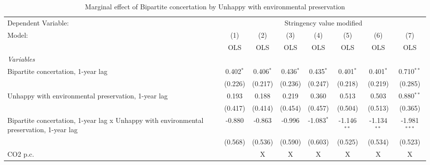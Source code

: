 
\begin{table}[htbp]
   \caption{Marginal effect of Bipartite concertation by Unhappy with environmental preservation}
   \centering
   \begin{tabular}{lccccccc}
      \toprule
      Dependent Variable: & \multicolumn{7}{c}{Stringency value modified}\\
      Model:                                                                                   & (1)         & (2)         & (3)         & (4)          & (5)           & (6)           & (7)\\  
                                                                                               &  OLS        & OLS         & OLS         & OLS          & OLS           & OLS           & OLS\\  
      \midrule
      \emph{Variables}\\
      Bipartite concertation, 1-year lag                                                       & 0.402$^{*}$ & 0.406$^{*}$ & 0.436$^{*}$ & 0.435$^{*}$  & 0.401$^{*}$   & 0.401$^{*}$   & 0.710$^{**}$\\   
                                                                                               & (0.226)     & (0.217)     & (0.236)     & (0.247)      & (0.218)       & (0.219)       & (0.285)\\   
      Unhappy with environmental preservation, 1-year lag                                      & 0.193       & 0.188       & 0.219       & 0.360        & 0.513         & 0.503         & 0.880$^{**}$\\   
                                                                                               & (0.417)     & (0.414)     & (0.454)     & (0.457)      & (0.504)       & (0.513)       & (0.365)\\   
      Bipartite concertation, 1-year lag x Unhappy with environmental preservation, 1-year lag & -0.880      & -0.863      & -0.996      & -1.083$^{*}$ & -1.146$^{**}$ & -1.134$^{**}$ & -1.981$^{***}$\\   
                                                                                               & (0.568)     & (0.536)     & (0.590)     & (0.603)      & (0.525)       & (0.534)       & (0.523)\\   
      CO2 p.c.                                                                                 &             & X           & X           & X            & X             & X             & X\\  

\end{tabular}
\end{table}
